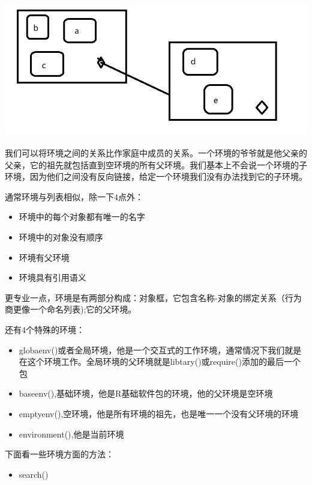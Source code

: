 \documentclass[]{book}
\providecommand{\tightlist}{%
  \setlength{\itemsep}{0pt}\setlength{\parskip}{0pt}}
\begin{document}
\begin{center}\includegraphics{img/ch7-5} \end{center}

我们可以将环境之间的关系比作家庭中成员的关系。一个环境的爷爷就是他父亲的父亲，它的祖先就包括直到空环境的所有父环境。我们基本上不会说一个环境的子环境，因为他们之间没有反向链接，给定一个环境我们没有办法找到它的子环境。

通常环境与列表相似，除一下4点外：

\begin{itemize}
\item
  环境中的每个对象都有唯一的名字
\item
  环境中的对象没有顺序
\item
  环境有父环境
\item
  环境具有引用语义
\end{itemize}

更专业一点，环境是有两部分构成：对象框，它包含名称-对象的绑定关系（行为商更像一个命名列表);它的父环境。

还有4个特殊的环境：

\begin{itemize}
\item
  globaenv()或者全局环境，他是一个交互式的工作环境，通常情况下我们就是在这个环境工作。全局环境的父环境就是libtary()或require()添加的最后一个包
\item
  baseenv(),基础环境，他是R基础软件包的环境，他的父环境是空环境
\item
  emptyenv(),空环境，他是所有环境的祖先，也是唯一一个没有父环境的环境
\item
  environment(),他是当前环境
\end{itemize}

下面看一些环境方面的方法：

\begin{itemize}
\tightlist
\item
  search()
\end{itemize}
\end{document}
